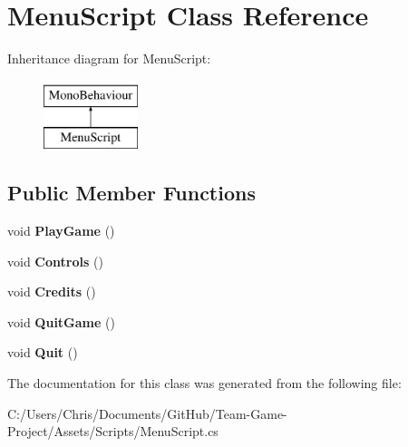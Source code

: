 \hypertarget{class_menu_script}{}\section{Menu\+Script Class Reference}
\label{class_menu_script}
Inheritance diagram for Menu\+Script\+:\begin{figure}[H]
\begin{center}
\leavevmode
\includegraphics[height=2.000000cm]{class_menu_script}
\end{center}
\end{figure}
\subsection*{Public Member Functions}
\begin{DoxyCompactItemize}
\item 
void {\bfseries Play\+Game} ()\hypertarget{class_menu_script_a585fc17a08729e2c324d800ff30147c5}{}\label{class_menu_script_a585fc17a08729e2c324d800ff30147c5}

\item 
void {\bfseries Controls} ()\hypertarget{class_menu_script_a6f6e3a38420fd0f3c56b20786b40554e}{}\label{class_menu_script_a6f6e3a38420fd0f3c56b20786b40554e}

\item 
void {\bfseries Credits} ()\hypertarget{class_menu_script_add5901d5a850a02a2319abc39d88129b}{}\label{class_menu_script_add5901d5a850a02a2319abc39d88129b}

\item 
void {\bfseries Quit\+Game} ()\hypertarget{class_menu_script_adeb18966f4fc959df8a10c0cdacff6cf}{}\label{class_menu_script_adeb18966f4fc959df8a10c0cdacff6cf}

\item 
void {\bfseries Quit} ()\hypertarget{class_menu_script_aa4928a7f9ae663832e3a8ed4af5f0c9e}{}\label{class_menu_script_aa4928a7f9ae663832e3a8ed4af5f0c9e}

\end{DoxyCompactItemize}


The documentation for this class was generated from the following file\+:\begin{DoxyCompactItemize}
\item 
C\+:/\+Users/\+Chris/\+Documents/\+Git\+Hub/\+Team-\/\+Game-\/\+Project/\+Assets/\+Scripts/Menu\+Script.\+cs\end{DoxyCompactItemize}

